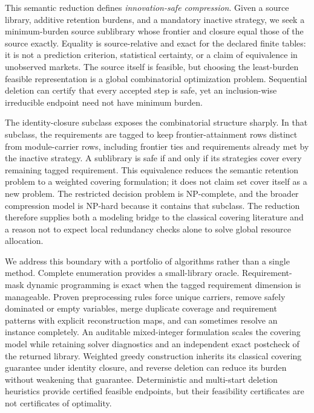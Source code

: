 This semantic reduction defines \emph{innovation-safe compression}. Given a
source library, additive retention burdens, and a mandatory inactive strategy,
we seek a minimum-burden source sublibrary whose frontier and closure equal
those of the source exactly. Equality is source-relative and exact for the
declared finite tables: it is not a prediction criterion, statistical
certainty, or a claim of equivalence in unobserved markets. The source itself
is feasible, but choosing the least-burden
feasible representation is a global combinatorial optimization problem.
Sequential deletion can certify that every accepted step is safe, yet an
inclusion-wise irreducible endpoint need not have minimum burden.

The identity-closure subclass exposes the combinatorial structure sharply. In
that subclass, the requirements are tagged to keep frontier-attainment rows
distinct from module-carrier rows, including frontier ties and requirements
already met by the inactive strategy. A sublibrary is safe if and only if its
strategies cover every remaining tagged requirement. This equivalence reduces
the semantic retention problem to a weighted covering formulation; it does not
claim set cover itself as a new problem. The restricted decision problem is
NP-complete, and the broader compression model is NP-hard because it contains
that subclass. The reduction therefore supplies both a modeling bridge to the
classical covering literature \citep{Karp1972,Chvatal1979} and a reason not to
expect local redundancy checks alone to solve global resource allocation.

We address this boundary with a portfolio of algorithms rather than a single
method. Complete enumeration provides a small-library oracle.
Requirement-mask dynamic programming is exact when the tagged requirement
dimension is manageable. Proven preprocessing rules force unique carriers,
remove safely dominated or empty variables, merge duplicate coverage and
requirement patterns with explicit reconstruction maps, and can sometimes
resolve an instance completely. An auditable mixed-integer formulation scales
the covering model while retaining solver diagnostics and an independent exact
postcheck of the returned library. Weighted greedy construction inherits its
classical covering guarantee under identity closure, and reverse deletion can
reduce its burden without weakening that guarantee. Deterministic and
multi-start deletion heuristics provide certified feasible endpoints, but
their feasibility certificates are not certificates of optimality.


